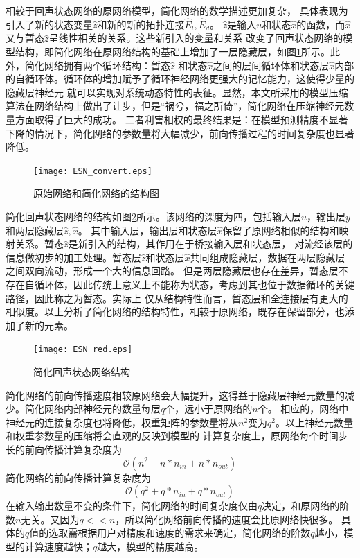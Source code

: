 相较于回声状态网络的原网络模型，简化网络的数学描述更加复杂， 具体表现为引入了新的状态变量\(\widehat{z}\)和新的新的拓扑连接\(\widehat{E}_l,\widehat{E}_d\)。
\(\widehat{z}\)是输入\(u\)和状态\(\widehat{x}\)的函数，而\(\widehat{x}\)又与暂态\(\widehat{z}\)呈线性相关的关系。这些新引入的变量和关系
改变了回声状态网络的模型结构，即简化网络在原网络结构的基础上增加了一层隐藏层，如图\ref{fig:esn_convert}所示。此外，简化网络拥有两个循环结构：暂态\(\widehat{z}\)
和状态\(\widehat{x}\)之间的层间循环体和状态层\(\widehat{x}\)内部的自循环体。循环体的增加赋予了循环神经网络更强大的记忆能力，这使得少量的隐藏层神经元
就可以实现对系统动态特性的表征。显然，本文所采用的模型压缩算法在网络结构上做出了让步，但是“祸兮，福之所倚”，简化网络在压缩神经元数量方面取得了巨大的成功。
二者利害相权的最终结果是：在模型预测精度不显著下降的情况下，简化网络的参数量将大幅减少，前向传播过程的时间复杂度也显著降低。
\begin{figure}
	\centering
	\texttt{[image: ESN\_convert.eps]}
	\caption{原始网络和简化网络的结构图}
	\label{fig:esn_convert}
\end{figure}

简化回声状态网络的结构如图\ref{fig:esn_red}所示。该网络的深度为四，包括输入层\(u\)，输出层\(y\)和两层隐藏层\(\widehat{z},\widehat{x}\)。
其中输入层，输出层和状态层\(\widehat{x}\)保留了原网络相似的结构和映射关系。暂态\(\widehat{z}\)是新引入的结构，其作用在于桥接输入层和状态层，
对流经该层的信息做初步的加工处理。暂态层\(\widehat{z}\)和状态层\(\widehat{x}\)共同组成隐藏层，数据在两层隐藏层之间双向流动，形成一个大的信息回路。
但是两层隐藏层也存在差异，暂态层不存在自循环体，因此传统上意义上不能称为状态，考虑到其也位于数据循环的关键路径，因此称之为暂态。实际上
仅从结构特性而言，暂态层和全连接层有更大的相似度。以上分析了简化网络的结构特性，相较于原网络，既存在保留部分，也添加了新的元素。 

\begin{figure}
	\centering
	\texttt{[image: ESN\_red.eps]}
	\caption{简化回声状态网络结构}
	\label{fig:esn_red}
\end{figure}

简化网络的前向传播速度相较原网络会大幅提升，这得益于隐藏层神经元数量的减少。简化网络内部神经元的数量每层\(q\)个，远小于原网络的\(n\)个。
相应的，网络中神经元的连接复杂度也将降低，权重矩阵的参数量将从\(n^2\)变为\(q^2\)。以上神经元数量和权重参数量的压缩将会直观的反映到模型的
计算复杂度上，原网络每个时间步长的前向传播计算复杂度为
\begin{equation}
	\mathcal{O}(n^2 + n*n_{in} + n*n_{out})
\end{equation}
简化网络的前向传播计算复杂度为
\begin{equation}
	\mathcal{O}(q^2 + q*n_{in} + q*n_{out})
	\label{eq:computeComplexity}
\end{equation}
在输入输出数量不变的条件下，简化网络的时间复杂度仅由\(q\)决定，和原网络的阶数\(n\)无关。又因为\(q<<n\)，所以简化网络前向传播的速度会比原网络快很多。
具体的\(q\)值的选取需根据用户对精度和速度的需求来确定，简化网络的阶数\(q\)越小，模型的计算速度越快；\(q\)越大，模型的精度越高。

